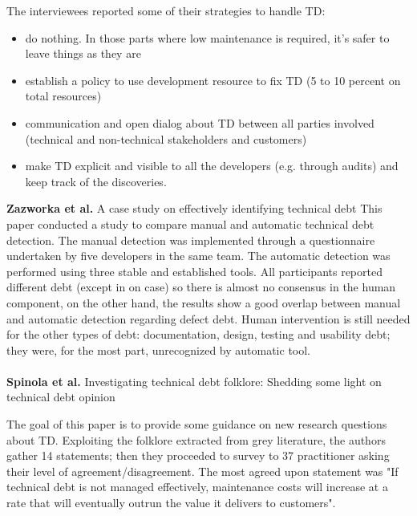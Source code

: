 The interviewees reported some of their strategies to handle TD:
\begin{itemize}
    \item do nothing. In those parts where low maintenance is required, it's safer to leave things as they are
    \item establish a policy to use development resource to fix TD (5 to 10 percent on total resources)
    \item communication and open dialog about TD between all parties involved (technical and non-technical stakeholders and customers)
    \item make TD explicit and visible to all the developers (e.g. through audits) and keep track of the discoveries.
\end{itemize}
\textbf{Zazworka et al.} \cite{zazworka2013case} A case study on effectively identifying technical debt
This paper conducted a study to compare manual and automatic technical debt detection. The manual detection was implemented through a questionnaire undertaken by five developers in the same team. The automatic detection was performed using three stable and established tools. 
All participants reported different debt (except in on case) so there is almost no consensus in the human component, on the other hand, the results show a good overlap between manual and automatic detection regarding defect debt. Human intervention is still needed for the other types of debt: documentation, design, testing and usability debt; they were, for the most part, unrecognized by automatic tool.
\\
\\
\textbf{Spinola et al.} \cite{spinola2013investigating} Investigating technical debt folklore: Shedding some light on technical debt opinion

The goal of this paper is to provide some guidance on new research questions about TD. Exploiting the folklore extracted from grey literature, the authors gather 14 statements; then they proceeded to survey to 37 practitioner asking their level of agreement/disagreement. The most agreed upon statement was "If technical debt is not managed effectively, maintenance costs will increase at a rate that will eventually outrun the value it delivers to customers".

